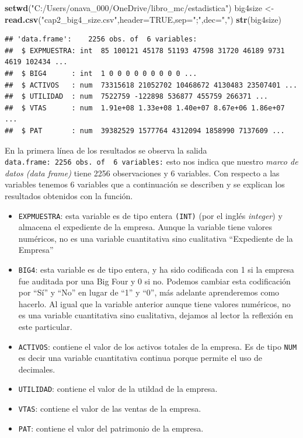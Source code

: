 \documentclass[]{book}
\newenvironment{Shaded}{\begin{snugshade}}{\end{snugshade}}
\newcommand{\DataTypeTok}[1]{\textcolor[rgb]{0.13,0.29,0.53}{#1}}
\newcommand{\KeywordTok}[1]{\textcolor[rgb]{0.13,0.29,0.53}{\textbf{#1}}}
\newcommand{\NormalTok}[1]{#1}
\newcommand{\OtherTok}[1]{\textcolor[rgb]{0.56,0.35,0.01}{#1}}
\newcommand{\StringTok}[1]{\textcolor[rgb]{0.31,0.60,0.02}{#1}}
\providecommand{\tightlist}{%
  \setlength{\itemsep}{0pt}\setlength{\parskip}{0pt}}
\begin{document}
\begin{Shaded}
\begin{Highlighting}[]
\KeywordTok{setwd}\NormalTok{(}\StringTok{"C:/Users/onava_000/OneDrive/libro_mc/estadistica"}\NormalTok{)}
\NormalTok{big4size <-}\StringTok{ }\KeywordTok{read.csv}\NormalTok{(}\StringTok{"cap2_big4_size.csv"}\NormalTok{,}\DataTypeTok{header=}\OtherTok{TRUE}\NormalTok{,}\DataTypeTok{sep=}\StringTok{";"}\NormalTok{,}\DataTypeTok{dec=}\StringTok{","}\NormalTok{)}
\KeywordTok{str}\NormalTok{(big4size)}
\end{Highlighting}
\end{Shaded}

\begin{verbatim}
## 'data.frame':    2256 obs. of  6 variables:
##  $ EXPMUESTRA: int  85 100121 45178 51193 47598 31720 46189 9731 4619 102434 ...
##  $ BIG4      : int  1 0 0 0 0 0 0 0 0 0 ...
##  $ ACTIVOS   : num  73315618 21052702 10468672 4130483 23507401 ...
##  $ UTILIDAD  : num  7522759 -122898 536877 455759 266371 ...
##  $ VTAS      : num  1.91e+08 1.33e+08 1.40e+07 8.67e+06 1.86e+07 ...
##  $ PAT       : num  39382529 1577764 4312094 1858990 7137609 ...
\end{verbatim}

En la primera línea de los resultados se observa la salida \texttt{\textquotesingle{}data.frame\textquotesingle{}:\ 2256\ obs.\ of\ \ 6\ variables:} esto nos indica que nuestro \emph{marco de datos (data frame)} tiene 2256 observaciones y 6 variables. Con respecto a las variables tenemos 6 variables que a continuación se describen y se explican los resultados obtenidos con la función.

\begin{itemize}
\tightlist
\item
  \texttt{EXPMUESTRA}: esta variable es de tipo entera \texttt{(INT)} (por el inglés \emph{integer}) y almacena el expediente de la empresa. Aunque la variable tiene valores numéricos, no es una variable cuantitativa sino cualitativa ``Expediente de la Empresa''
\item
  \texttt{BIG4}: esta variable es de tipo entera, y ha sido codificada con 1 si la empresa fue auditada por una Big Four y 0 si no. Podemos cambiar esta codificación por ``Sí'' y ``No'' en lugar de ``1'' y ``0'', más adelante aprenderemos como hacerlo. Al igual que la variable anterior aunque tiene valores numéricos, no es una variable cuantitativa sino cualitativa, dejamos al lector la reflexión en este particular.
\item
  \texttt{ACTIVOS}: contiene el valor de los activos totales de la empresa. Es de tipo \texttt{NUM} es decir una variable cuantitativa continua porque permite el uso de decimales.
\item
  \texttt{UTILIDAD}: contiene el valor de la utildad de la empresa.
\item
  \texttt{VTAS}: contiene el valor de las ventas de la empresa.
\item
  \texttt{PAT}: contiene el valor del patrimonio de la empresa.
\end{itemize}
\end{document}

